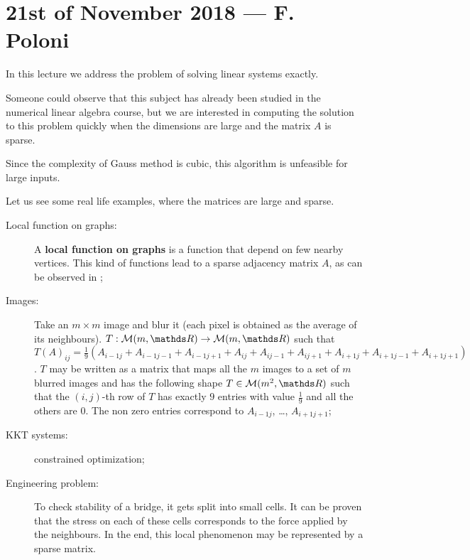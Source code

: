 \documentclass[ComputationalMathematics.tex]{subfiles}
\begin{document}
\section{21st of November 2018 --- F. Poloni}

In this lecture we address the problem of solving linear systems exactly.

Someone could observe that this subject has already been studied in the numerical linear algebra course, but we are interested in computing the solution  to this problem quickly when the dimensions are large and the matrix $A$ is sparse.

Since the complexity of Gauss method is cubic, this algorithm is unfeasible for large inputs.

Let us see some real life examples, where the matrices are large and sparse.

\begin{description}
  \item[{\sc Local function on graphs:}] A \textbf{local function on graphs} is a function that depend on few nearby vertices.
    This kind of functions lead to a sparse adjacency matrix $A$, as can be observed in ;

  \item[{\sc Images:}] Take an $m \times m$ image and blur it (each pixel is obtained as the average of its neighbours). $T: \mathcal{M}(m, \R) \to \mathcal{M}(m, \R)$ such that ${T(A)}_{ij} = \frac{1}{9} (A_{i-1 j} + A_{i-1 j-1} + A_{i-1 j+1} + A_{i j} + A_{i j-1} + A_{i j+1} + A_{i+1 j} + A_{i+1 j-1} + A_{i+1 j+1})$. $T$ may be written as a matrix that maps all the $m$ images to a set of $m$ blurred images and has the following shape $T \in \mathcal{M}(m^2, \R)$ such that the $(i, j)$-th row of $T$ has exactly $9$ entries with value $\frac{1}{9}$ and all the others are $0$. The non zero entries correspond to $A_{i-1 j}$, \ldots, $A_{i+1 j+1}$;
  \item[{\sc KKT systems:}] constrained optimization;
  \item[{\sc Engineering problem:}] To check stability of a bridge, it gets split into small cells. It can be proven that the stress on each of these cells corresponds to the force applied by the neighbours. In the end, this local phenomenon may be represented by a sparse matrix.
\end{description}
\end{document}
